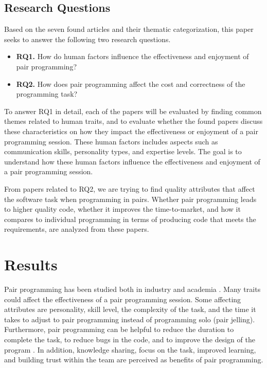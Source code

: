 \documentclass[conference]{IEEEtran}
\begin{document}
\subsection{Research Questions}

Based on the seven found articles and their thematic categorization, this paper seeks to answer the following two research questions.

\begin{itemize}
    \item \textbf{RQ1.} How do human factors influence the effectiveness and enjoyment of pair programming?
    \item \textbf{RQ2.} How does pair programming affect the cost and correctness of the programming task?
\end{itemize}

To answer RQ1 in detail, each of the papers will be evaluated by finding common themes related to human traits, and to evaluate whether the found papers discuss these characteristics on how they impact the effectiveness or enjoyment of a pair programming session. These human factors includes aspects such as communication skills, personality types, and expertise levels. The goal is to understand how these human factors influence the effectiveness and enjoyment of a pair programming session.

From papers related to RQ2, we are trying to find quality attributes that affect the software task when programming in pairs. Whether pair programming leads to higher quality code, whether it improves the time-to-market, and how it compares to individual programming in terms of producing code that meets the requirements, are analyzed from these papers.

\section{Results}

Pair programming has been studied both in industry and academia \cite{Williams2000Strengthening, 10.1145/1414004.1414026, Hannay2009effectiveness}. Many traits could affect the effectiveness of a pair programming session. Some affecting attributes are personality, skill level, the complexity of the task, and the time it takes to adjust to pair programming instead of programming solo (pair jelling). Furthermore, pair programming can be helpful to reduce the duration to complete the task, to reduce bugs in the code, and to improve the design of the program \cite{10.1145/2652524.2652529}. In addition, knowledge sharing, focus on the task, improved learning, and building trust within the team are perceived as benefits of pair programming.
\end{document}
